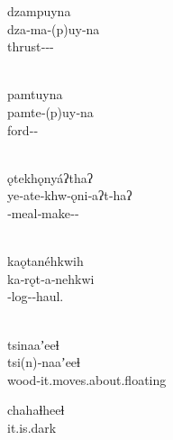 \begin{exe}

  \ex\label{ex:2.10}
  \begin{xlist}

    \ex
    \glll dzampuyna\\
          dza‑ma‑(p)uy‑na\\
          thrust‑‑‑\\
    \\

    \ex
    \glll pamtuyna\\
          pamte‑(p)uy‑na\\
          ford‑‑\\
    \\

  \end{xlist}

  \ex\label{ex:2.11}
  \begin{xlist}

    \ex\label{ex:2.11a}
    \glll ǫtekhǫnyáʔthaʔ\\
          ye‑ate‑khw‑ǫni‑aʔt‑haʔ\\
          ‑meal‑make‑‑\\
    \\

    \ex\label{ex:2.11b}
    \glll kaǫtanéhkwih\\
          ka‑rǫt‑a‑nehkwi\\
          ‑log‑‑haul.\\
    \\

  \end{xlist}

  \ex\label{ex:2.12}
  \begin{xlist}

    \ex
    \gll tsinaaʼeeɬ\\
         tsi(n)‑naaʼeeɬ\\
         wood‑it.moves.about.floating\\

    \ex
    \gll chahaɬheeɬ\\
         it.is.dark\\

  \end{xlist}

\end{exe}

